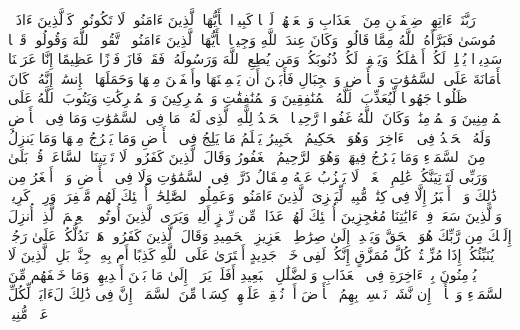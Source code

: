 \startbuffer[\q:33:68]
رَبَّنَاۤ ءَاتِهِمۡ ضِعۡفَیۡنِ مِنَ ٱلۡعَذَابِ وَٱلۡعَنۡهُمۡ لَعۡنࣰا كَبِیرࣰا%
\stopbuffer
\startbuffer[\q:33:69]
یَٰۤأَیُّهَا ٱلَّذِینَ ءَامَنُوا۟ لَا تَكُونُوا۟ كَٱلَّذِینَ ءَاذَوۡا۟ مُوسَىٰ فَبَرَّأَهُ ٱللَّهُ مِمَّا قَالُوا۟ۚ وَكَانَ عِندَ ٱللَّهِ وَجِیهࣰا%
\stopbuffer
\startbuffer[\q:33:70]
یَٰۤأَیُّهَا ٱلَّذِینَ ءَامَنُوا۟ ٱتَّقُوا۟ ٱللَّهَ وَقُولُوا۟ قَوۡلࣰا سَدِیدࣰا%
\stopbuffer
\startbuffer[\q:33:71]
یُصۡلِحۡ لَكُمۡ أَعۡمَٰلَكُمۡ وَیَغۡفِرۡ لَكُمۡ ذُنُوبَكُمۡۗ وَمَن یُطِعِ ٱللَّهَ وَرَسُولَهُۥ فَقَدۡ فَازَ فَوۡزًا عَظِیمًا%
\stopbuffer
\startbuffer[\q:33:72]
إِنَّا عَرَضۡنَا ٱلۡأَمَانَةَ عَلَى ٱلسَّمَٰوَٰتِ وَٱلۡأَرۡضِ وَٱلۡجِبَالِ فَأَبَیۡنَ أَن یَحۡمِلۡنَهَا وأَشۡفَقۡنَ مِنۡهَا وَحَمَلَهَا ٱلۡإِنسَٰنُۖ إِنَّهُۥ كَانَ ظَلُومࣰا جَهُولࣰا%
\stopbuffer
\startbuffer[\q:33:73]
لِّیُعَذِّبَ ٱللَّهُ ٱلۡمُنَٰفِقِینَ وَٱلۡمُنَٰفِقَٰتِ وَٱلۡمُشۡرِكِینَ وَٱلۡمُشۡرِكَٰتِ وَیَتُوبَ ٱللَّهُ عَلَى ٱلۡمُؤۡمِنِینَ وَٱلۡمُؤۡمِنَٰتِۗ وَكَانَ ٱللَّهُ غَفُورࣰا رَّحِیمَۢا%
\stopbuffer
\startbuffer[\q:34:1]
ٱلۡحَمۡدُ لِلَّهِ ٱلَّذِی لَهُۥ مَا فِی ٱلسَّمَٰوَٰتِ وَمَا فِی ٱلۡأَرۡضِ وَلَهُ ٱلۡحَمۡدُ فِی ٱلۡءَاخِرَةِۚ وَهُوَ ٱلۡحَكِیمُ ٱلۡخَبِیرُ%
\stopbuffer
\startbuffer[\q:34:2]
یَعۡلَمُ مَا یَلِجُ فِی ٱلۡأَرۡضِ وَمَا یَخۡرُجُ مِنۡهَا وَمَا یَنزِلُ مِنَ ٱلسَّمَاۤءِ وَمَا یَعۡرُجُ فِیهَاۚ وَهُوَ ٱلرَّحِیمُ ٱلۡغَفُورُ%
\stopbuffer
\startbuffer[\q:34:3]
وَقَالَ ٱلَّذِینَ كَفَرُوا۟ لَا تَأۡتِینَا ٱلسَّاعَةُۖ قُلۡ بَلَىٰ وَرَبِّی لَتَأۡتِیَنَّكُمۡ عَٰلِمِ ٱلۡغَیۡبِۖ لَا یَعۡزُبُ عَنۡهُ مِثۡقَالُ ذَرَّةࣲ فِی ٱلسَّمَٰوَٰتِ وَلَا فِی ٱلۡأَرۡضِ وَلَاۤ أَصۡغَرُ مِن ذَٰلِكَ وَلَاۤ أَكۡبَرُ إِلَّا فِی كِتَٰبࣲ مُّبِینࣲ%
\stopbuffer
\startbuffer[\q:34:4]
لِّیَجۡزِیَ ٱلَّذِینَ ءَامَنُوا۟ وَعَمِلُوا۟ ٱلصَّٰلِحَٰتِۚ أُو۟لَٰۤئِكَ لَهُم مَّغۡفِرَةࣱ وَرِزۡقࣱ كَرِیمࣱ%
\stopbuffer
\startbuffer[\q:34:5]
وَٱلَّذِینَ سَعَوۡ فِیۤ ءَایَٰتِنَا مُعَٰجِزِینَ أُو۟لَٰۤئِكَ لَهُمۡ عَذَابࣱ مِّن رِّجۡزٍ أَلِیمࣱ%
\stopbuffer
\startbuffer[\q:34:6]
وَیَرَى ٱلَّذِینَ أُوتُوا۟ ٱلۡعِلۡمَ ٱلَّذِیۤ أُنزِلَ إِلَیۡكَ مِن رَّبِّكَ هُوَ ٱلۡحَقَّ وَیَهۡدِیۤ إِلَىٰ صِرَٰطِ ٱلۡعَزِیزِ ٱلۡحَمِیدِ%
\stopbuffer
\startbuffer[\q:34:7]
وَقَالَ ٱلَّذِینَ كَفَرُوا۟ هَلۡ نَدُلُّكُمۡ عَلَىٰ رَجُلࣲ یُنَبِّئُكُمۡ إِذَا مُزِّقۡتُمۡ كُلَّ مُمَزَّقٍ إِنَّكُمۡ لَفِی خَلۡقࣲ جَدِیدٍ%
\stopbuffer
\startbuffer[\q:34:8]
أَفۡتَرَىٰ عَلَى ٱللَّهِ كَذِبًا أَم بِهِۦ جِنَّةُۢۗ بَلِ ٱلَّذِینَ لَا یُؤۡمِنُونَ بِٱلۡءَاخِرَةِ فِی ٱلۡعَذَابِ وَٱلضَّلَٰلِ ٱلۡبَعِیدِ%
\stopbuffer
\startbuffer[\q:34:9]
أَفَلَمۡ یَرَوۡا۟ إِلَىٰ مَا بَیۡنَ أَیۡدِیهِمۡ وَمَا خَلۡفَهُم مِّنَ ٱلسَّمَاۤءِ وَٱلۡأَرۡضِۚ إِن نَّشَأۡ نَخۡسِفۡ بِهِمُ ٱلۡأَرۡضَ أَوۡ نُسۡقِطۡ عَلَیۡهِمۡ كِسَفࣰا مِّنَ ٱلسَّمَاۤءِۚ إِنَّ فِی ذَٰلِكَ لَءَایَةࣰ لِّكُلِّ عَبۡدࣲ مُّنِیبࣲ%
